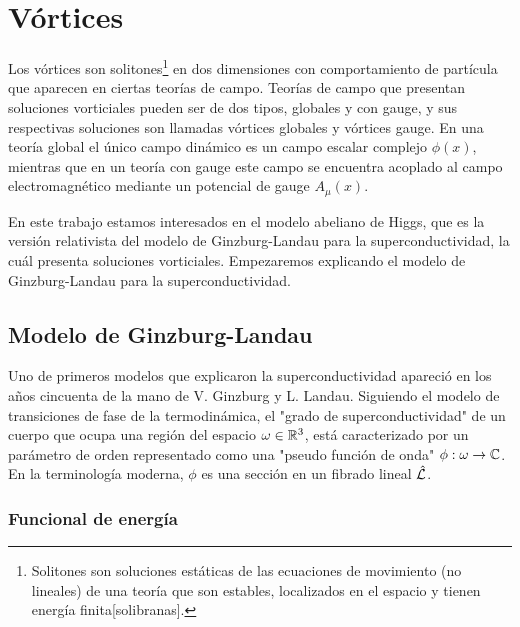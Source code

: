 
\chapter{Vórtices} %

\label{ch:introduction} %


Los vórtices son solitones\footnote{Solitones son soluciones estáticas de las ecuaciones de movimiento (no lineales) de una teoría que son estables, localizados en el espacio y tienen energía finita[solibranas].} en dos dimensiones con comportamiento de partícula que aparecen en ciertas teorías de campo.
Teorías de campo que presentan soluciones vorticiales pueden ser de dos tipos, globales y con gauge, y sus respectivas soluciones son llamadas vórtices globales y vórtices gauge. En una teoría global el único campo dinámico es un campo escalar complejo $\phi(x)$, mientras que en un teoría con gauge este campo se encuentra acoplado al campo electromagnético mediante un potencial de gauge $A_\mu(x)$. 

En este trabajo estamos interesados en el modelo abeliano de Higgs, que es la versión relativista del modelo de Ginzburg-Landau para la superconductividad, la cuál presenta soluciones vorticiales. Empezaremos explicando el modelo de Ginzburg-Landau para la superconductividad.

\section{Modelo de Ginzburg-Landau}

Uno de primeros modelos que explicaron la superconductividad apareció en los años cincuenta de la mano de V. Ginzburg y L. Landau.  Siguiendo el modelo de transiciones de fase de la termodinámica, el "grado de superconductividad" de un cuerpo que ocupa una región del espacio $\omega\in\mathbb{R}^3$, está caracterizado por un parámetro de orden representado como una "pseudo función de onda" $\phi:\omega\rightarrow\mathbb{C}$. En la terminología moderna, $\phi$ es una sección en un fibrado lineal $\hat{\mathcal{L}}$.

\subsection{Funcional de energía}

